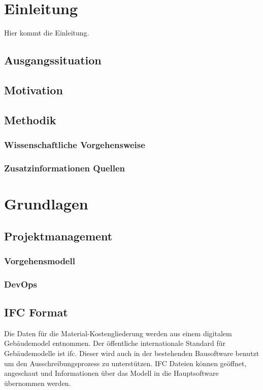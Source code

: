 \section{Einleitung}
\label{s:intro}

Hier kommt die Einleitung.

\subsection{Ausgangssituation}
\subsection{Motivation}
\subsection{Methodik}
\subsubsection{Wissenschaftliche Vorgehensweise}
\subsubsection{Zusatzinformationen Quellen}
\label{ss:intro:abc}

\section{Grundlagen}
\subsection{Projektmanagement}
\subsubsection{Vorgehensmodell}
\subsubsection{DevOps}

\subsection{IFC Format}

Die Daten für die Material-Kostengliederung werden aus einem digitalem Gebäudemodel entnommen. Der öffentliche internationale Standard für Gebäudemodelle ist \ac{ifc}. \cite{IFC4_doc} Dieser wird auch in der bestehenden Bausoftware benutzt um den Ausschreibungsprozess zu unterstützen. IFC Dateien können geöffnet, angeschaut und Informationen über das Modell in die Hauptsoftware übernommen werden.

